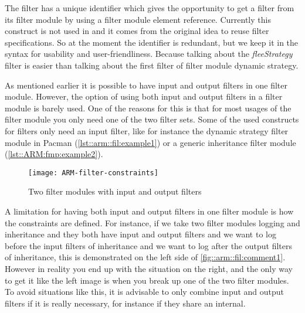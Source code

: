 The filter has a unique identifier which gives the opportunity to get a filter from its filter module by
using a filter module element reference. 
Currently this construct is not used in \Compose* and it comes from the original idea to reuse filter specifications.
So at the moment the identifier is redundant, but we keep it in the syntax for usability and user-friendliness. 
Because talking about the \emph{fleeStrategy} filter is easier than talking about the first filter of filter module dynamic strategy.

As mentioned earlier it is possible to have input and output filters in one filter module. 
However, the option of using both input and output filters in a filter module is barely used.
One of the reasons for this is that for most usages of the filter module you only need one of the two filter sets. 
Some of the used constructs for filters only need an input filter, like for instance the dynamic strategy filter module in Pacman (\autoref{lst::arm::fil:example1}) or a generic inheritance filter module (\autoref{lst::ARM:fmp:example2}).

\begin{figure}[tpb]
	\centering
	\texttt{[image: ARM-filter-constraints]}
	\caption{Two filter modules with input and output filters}
	\label{fig::arm::fil:comment1}
\end{figure}

A limitation for having both input and output filters in one filter module is how the constraints are defined.
For instance, if we take two filter modules logging and inheritance and they both have input and output filters and we want to log before the input filters of inheritance and we want to log after the output filters of inheritance, this is demonstrated on the left side of \autoref{fig::arm::fil:comment1}. 
However in reality you end up with the situation on the right, and the only way to get it like the left image is when you break up one of the two filter modules.
To avoid situations like this, it is advisable to only combine input and output filters if it is really necessary, for instance if they share an internal.


